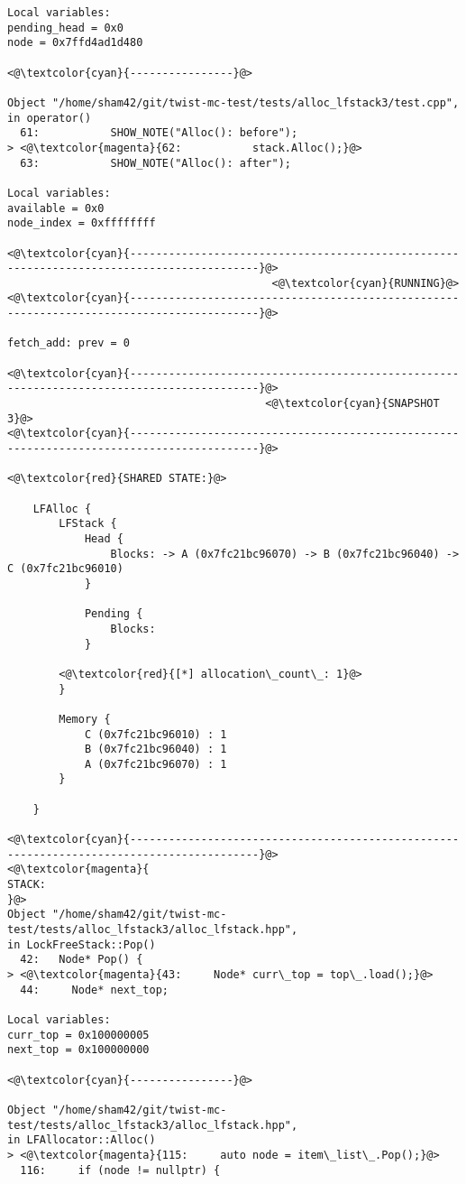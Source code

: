 \begin{adjustwidth}{-3.3cm}{-1cm}
\begin{allintypewriter}
\begin{multicols*}{2}
\begin{lstlisting}[numbers=none]
Local variables: 
pending_head = 0x0
node = 0x7ffd4ad1d480

<@\textcolor{cyan}{----------------}@>

Object "/home/sham42/git/twist-mc-test/tests/alloc_lfstack3/test.cpp",
in operator()
  61:           SHOW_NOTE("Alloc(): before");
> <@\textcolor{magenta}{62:           stack.Alloc();}@>
  63:           SHOW_NOTE("Alloc(): after");

Local variables: 
available = 0x0
node_index = 0xffffffff

<@\textcolor{cyan}{------------------------------------------------------------------------------------------}@>
                                         <@\textcolor{cyan}{RUNNING}@>
<@\textcolor{cyan}{------------------------------------------------------------------------------------------}@>

fetch_add: prev = 0

<@\textcolor{cyan}{------------------------------------------------------------------------------------------}@>
                                        <@\textcolor{cyan}{SNAPSHOT 3}@>
<@\textcolor{cyan}{------------------------------------------------------------------------------------------}@>

<@\textcolor{red}{SHARED STATE:}@>

    LFAlloc {
	    LFStack {
		    Head {
			    Blocks: -> A (0x7fc21bc96070) -> B (0x7fc21bc96040) -> C (0x7fc21bc96010) 
		    }

		    Pending {
			    Blocks: 
		    }

		<@\textcolor{red}{[*] allocation\_count\_: 1}@>
	    }

	    Memory {
		    C (0x7fc21bc96010) : 1
		    B (0x7fc21bc96040) : 1
		    A (0x7fc21bc96070) : 1
	    }

    }

<@\textcolor{cyan}{------------------------------------------------------------------------------------------}@>
<@\textcolor{magenta}{
STACK:
}@>
Object "/home/sham42/git/twist-mc-test/tests/alloc_lfstack3/alloc_lfstack.hpp",
in LockFreeStack::Pop()
  42:   Node* Pop() {
> <@\textcolor{magenta}{43:     Node* curr\_top = top\_.load();}@>
  44:     Node* next_top;

Local variables: 
curr_top = 0x100000005
next_top = 0x100000000

<@\textcolor{cyan}{----------------}@>

Object "/home/sham42/git/twist-mc-test/tests/alloc_lfstack3/alloc_lfstack.hpp",
in LFAllocator::Alloc()
> <@\textcolor{magenta}{115:     auto node = item\_list\_.Pop();}@>
  116:     if (node != nullptr) {


\end{lstlisting}
\end{multicols*}
\end{allintypewriter}
\end{adjustwidth}
